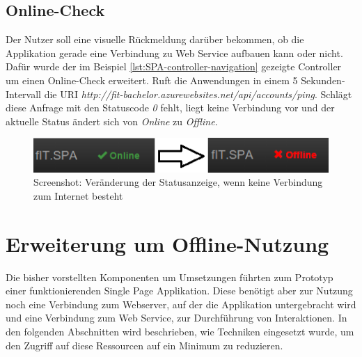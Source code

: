 \subsection{Online-Check}
\label{ssec:Online-Check}
Der Nutzer soll eine visuelle Rückmeldung darüber bekommen, ob die Applikation gerade eine Verbindung zu Web Service aufbauen kann oder nicht. Dafür wurde der im Beispiel \ref{lst:SPA-controller-navigation} gezeigte Controller um einen Online-Check erweitert. Ruft die Anwendungen in einem 5 Sekunden-Intervall die URI \textit{http://fit-bachelor.azurewebsites.net/api/accounts/ping}. Schlägt diese Anfrage mit den Statuscode \textit{0} fehlt, liegt keine Verbindung vor und der aktuelle Status ändert sich von \textit{Online} zu \textit{Offline}.
\begin{figure}[h]
\centering
\includegraphics[width=0.8\linewidth]{content/images/SPA-Online-Check}
\caption{Screenshot: Veränderung der Statusanzeige, wenn keine Verbindung zum Internet besteht}
\label{pic:SPA:OnlineCheck:Statusänderung}
\end{figure}

\section{Erweiterung um Offline-Nutzung}
\label{sec:CachedHttpService}
Die bisher vorstellten Komponenten um Umsetzungen führten zum Prototyp einer funktionierenden Single Page Applikation. Diese benötigt aber zur Nutzung noch eine Verbindung zum Webserver, auf der die Applikation untergebracht wird und eine Verbindung zum Web Service, zur Durchführung von Interaktionen. In den folgenden Abschnitten wird beschrieben, wie Techniken eingesetzt wurde, um den Zugriff auf diese Ressourcen auf ein Minimum zu reduzieren. 

